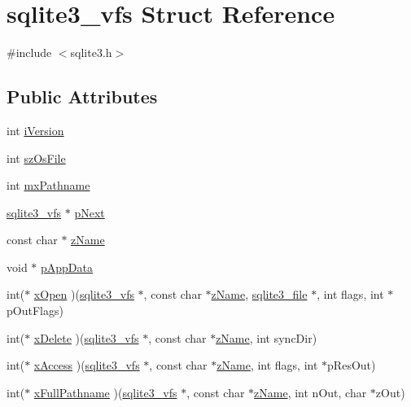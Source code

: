\hypertarget{structsqlite3__vfs}{\section{sqlite3\-\_\-vfs Struct Reference}
\label{structsqlite3__vfs}
}


{\ttfamily \#include $<$sqlite3.\-h$>$}

\subsection*{Public Attributes}
\begin{DoxyCompactItemize}
\item 
int \hyperlink{structsqlite3__vfs_a694dd264949bd163545fe174510ed019}{i\-Version}
\item 
int \hyperlink{structsqlite3__vfs_a549399081342d61134b6398562a0a997}{sz\-Os\-File}
\item 
int \hyperlink{structsqlite3__vfs_adb2d82c74891b00b5529fb94e7710135}{mx\-Pathname}
\item 
\hyperlink{structsqlite3__vfs}{sqlite3\-\_\-vfs} $\ast$ \hyperlink{structsqlite3__vfs_a4b12c503e4083854a9c4d91697a12de3}{p\-Next}
\item 
const char $\ast$ \hyperlink{structsqlite3__vfs_a01a82d3e1a7efc00a762a00751ed592b}{z\-Name}
\item 
void $\ast$ \hyperlink{structsqlite3__vfs_a8de686c5e679ba421479ac96d6654527}{p\-App\-Data}
\item 
int($\ast$ \hyperlink{structsqlite3__vfs_a5f35d5528d8fdf1d26e1e206879afbe1}{x\-Open} )(\hyperlink{structsqlite3__vfs}{sqlite3\-\_\-vfs} $\ast$, const char $\ast$\hyperlink{structsqlite3__vfs_a01a82d3e1a7efc00a762a00751ed592b}{z\-Name}, \hyperlink{structsqlite3__file}{sqlite3\-\_\-file} $\ast$, int flags, int $\ast$p\-Out\-Flags)
\item 
int($\ast$ \hyperlink{structsqlite3__vfs_a5f547a3e54f91c7ebef140d51054bbc0}{x\-Delete} )(\hyperlink{structsqlite3__vfs}{sqlite3\-\_\-vfs} $\ast$, const char $\ast$\hyperlink{structsqlite3__vfs_a01a82d3e1a7efc00a762a00751ed592b}{z\-Name}, int sync\-Dir)
\item 
int($\ast$ \hyperlink{structsqlite3__vfs_ab4344474034c2dbc9223a362c65ff235}{x\-Access} )(\hyperlink{structsqlite3__vfs}{sqlite3\-\_\-vfs} $\ast$, const char $\ast$\hyperlink{structsqlite3__vfs_a01a82d3e1a7efc00a762a00751ed592b}{z\-Name}, int flags, int $\ast$p\-Res\-Out)
\item 
int($\ast$ \hyperlink{structsqlite3__vfs_a02fafc56d26adab5f236df6493a8bd55}{x\-Full\-Pathname} )(\hyperlink{structsqlite3__vfs}{sqlite3\-\_\-vfs} $\ast$, const char $\ast$\hyperlink{structsqlite3__vfs_a01a82d3e1a7efc00a762a00751ed592b}{z\-Name}, int n\-Out, char $\ast$z\-Out)

\end{DoxyCompactItemize}
